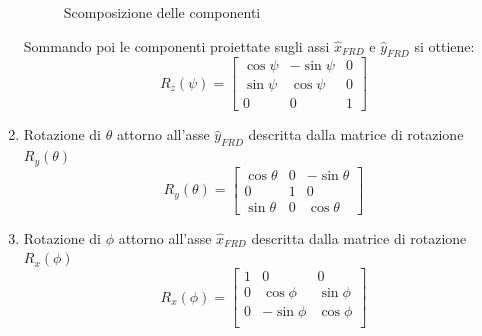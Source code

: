 \begin{enumerate}
\begin{figure}[H]
              \caption{Scomposizione delle componenti}
          \end{figure}


          Sommando poi le componenti proiettate sugli assi $\hat{x}_{FRD}$ e $\hat{y}_{FRD}$ si ottiene:
          \begin{equation*}
              R_{z}(\psi) = \begin{bmatrix}
                  \cos\psi & -\sin\psi & 0 \\
                  \sin\psi & \cos\psi  & 0 \\
                  0        & 0         & 1
              \end{bmatrix}
          \end{equation*}
    \item Rotazione di $\theta$ attorno all'asse $\hat{y}_{FRD}$ descritta dalla matrice di rotazione $R_{y}(\theta)$
          \begin{equation*}
              R_{y}(\theta) = \begin{bmatrix}
                  \cos\theta & 0 & -\sin\theta \\
                  0          & 1 & 0           \\
                  \sin\theta & 0 & \cos\theta
              \end{bmatrix}
          \end{equation*}
    \item Rotazione di $\phi$ attorno all'asse $\hat{x}_{FRD}$ descritta dalla matrice di rotazione $R_{x}(\phi)$
          \begin{equation*}
              R_{x}(\phi) = \begin{bmatrix}
                  1 & 0         & 0        \\
                  0 & \cos\phi  & \sin\phi \\
                  0 & -\sin\phi & \cos\phi \\
              \end{bmatrix}
          \end{equation*}
\end{enumerate}

